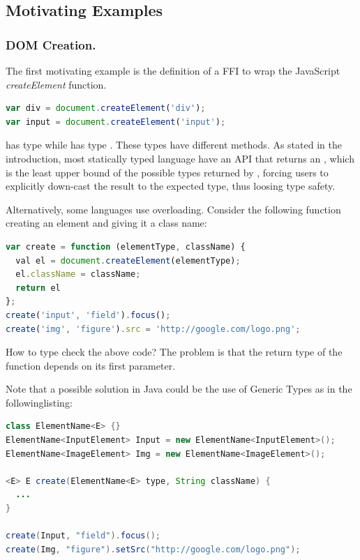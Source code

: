 \documentclass[runningheads,a4paper]{llncs}
\begin{document}

\subsection{Motivating Examples}

\subsubsection{DOM Creation.}

The first motivating example is the definition of a FFI to wrap the JavaScript \textit{createElement} function.

\begin{lstlisting}[language=JavaScript]
var div = document.createElement('div');
var input = document.createElement('input');
\end{lstlisting}

 has type  while  has type . These types
have different methods. As stated in the introduction, most statically typed language have an API
that returns an , which is the least upper bound of the possible types returned by
, forcing users to explicitly down-cast the result to the expected type, thus
loosing type safety.

Alternatively, some languages use overloading. Consider the following function creating an element and giving it a class name:

\begin{lstlisting}[language=JavaScript]
var create = function (elementType, className) {
  val el = document.createElement(elementType);
  el.className = className;
  return el
};
create('input', 'field').focus();
create('img', 'figure').src = 'http://google.com/logo.png';
\end{lstlisting}

How to type check the above code? The problem is that the return type of the  function
depends on its first parameter.

Note that a possible solution in Java could be the use of Generic Types as in the followinglisting:

\begin{lstlisting}[language=Java]
class ElementName<E> {}
ElementName<InputElement> Input = new ElementName<InputElement>();
ElementName<ImageElement> Img = new ElementName<ImageElement>();

<E> E create(ElementName<E> type, String className) {
  ...
}

create(Input, "field").focus();
create(Img, "figure").setSrc("http://google.com/logo.png");
\end{lstlisting}
\end{document}
